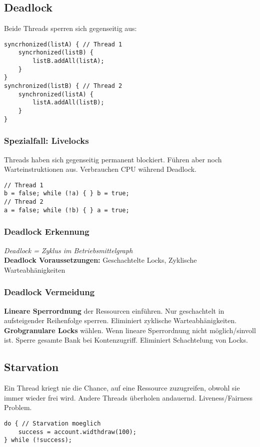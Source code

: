 \subsection{Deadlock}
Beide Threads sperren sich gegenseitig aus:
\begin{lstlisting}
syncrhonized(listA) { // Thread 1
    syncrhonized(listB) {
        listB.addAll(listA);
    }
}
synchronized(listB) { // Thread 2
    synchronized(listA) {
        listA.addAll(listB);
    }
}
\end{lstlisting}

\subsubsection{Spezialfall: Livelocks}
Threads haben sich gegenseitig permanent blockiert. Führen aber noch Warteinstruktionen aus.
Verbrauchen CPU während Deadlock.
\begin{lstlisting}
// Thread 1
b = false; while (!a) { } b = true;
// Thread 2
a = false; while (!b) { } a = true;
\end{lstlisting}

\subsubsection{Deadlock Erkennung}
\textit{Deadlock = Zyklus im Betriebsmittelgraph}\\ 
\textbf{Deadlock Voraussetzungen:} Geschachtelte Locks, Zyklische Warteabhänigkeiten

\subsubsection{Deadlock Vermeidung}
\textbf{Lineare Sperrordnung} der Ressourcen einführen. 
Nur geschachtelt in aufsteigender Reihenfolge sperren. 
Eliminiert zyklische Warteabhänigkeiten.\\ 
\textbf{Grobgranulare Locks} wählen.
Wenn lineare Sperrordnung nicht möglich/sinvoll ist.
Sperre gesamte Bank bei Kontenzugriff.
Eliminiert Schachtelung von Locks.

\subsection{Starvation}
Ein Thread kriegt nie die Chance, auf eine Ressource zuzugreifen, obwohl sie immer wieder frei wird.
Andere Threads überholen andauernd. Liveness/Fairness Problem.
\begin{lstlisting}
do { // Starvation moeglich 
    success = account.widthdraw(100);
} while (!success);
\end{lstlisting}

